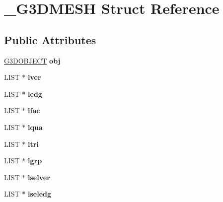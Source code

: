 \hypertarget{struct__G3DMESH}{}\section{\+\_\+\+G3\+D\+M\+E\+SH Struct Reference}
\label{struct__G3DMESH}
\subsection*{Public Attributes}
\begin{DoxyCompactItemize}
\item 
\mbox{\label{struct__G3DMESH_a79c6c9f8c9e92d54571816b53ce67702}} 
\hyperlink{struct__G3DOBJECT}{G3\+D\+O\+B\+J\+E\+CT} {\bfseries obj}
\item 
\mbox{\label{struct__G3DMESH_a06d3bd79ffdf0fa21755ca02230026e6}} 
L\+I\+ST $\ast$ {\bfseries lver}
\item 
\mbox{\label{struct__G3DMESH_a05910a3c1fe9a4d5a1670df169622c6b}} 
L\+I\+ST $\ast$ {\bfseries ledg}
\item 
\mbox{\label{struct__G3DMESH_af00659478417c875ffca3d23d07a4ae2}} 
L\+I\+ST $\ast$ {\bfseries lfac}
\item 
\mbox{\label{struct__G3DMESH_aee85ee100e8ccbcbb6c522238f8dbf7f}} 
L\+I\+ST $\ast$ {\bfseries lqua}
\item 
\mbox{\label{struct__G3DMESH_ae7504633ff2bf6b020d63457a03f425b}} 
L\+I\+ST $\ast$ {\bfseries ltri}
\item 
\mbox{\label{struct__G3DMESH_aec42ac653a8949c61c447830b5df1afe}} 
L\+I\+ST $\ast$ {\bfseries lgrp}
\item 
\mbox{\label{struct__G3DMESH_a077c8878c9a1a0a8735ad99e4ed401be}} 
L\+I\+ST $\ast$ {\bfseries lselver}
\item 
\mbox{\label{struct__G3DMESH_a74b026c48938f3e154a148ea39d7a2d3}} 
L\+I\+ST $\ast$ {\bfseries lseledg}
\item 
\mbox{\label{struct__G3DMESH_aa2bceac562a738003ca847883beeb32e}} 

\end{DoxyCompactItemize}
